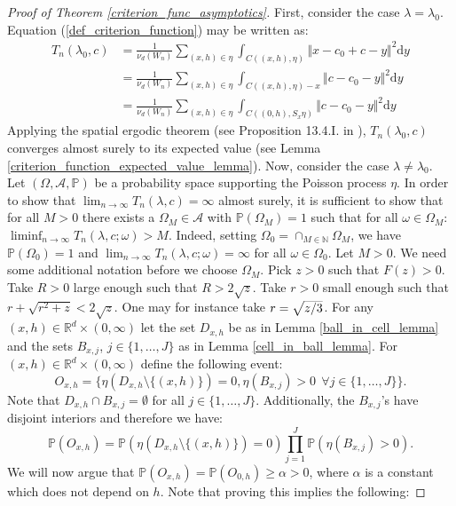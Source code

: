 \documentclass{article}
\newcommand{\NN}{\mathbb{N}}
\newcommand{\RR}{\mathbb{R}}
\newcommand{\PP}{\mathbb{P}}
\theoremstyle{plain}
\theoremstyle{remark}
\theoremstyle{definition}
\begin{document}
\begin{proof}[Proof of Theorem \ref{criterion_func_asymptotics}]
    First, consider the case $\lambda = \lambda_0$. Equation (\ref{def_criterion_function}) may be written as:
    \begin{align*}
        T_n(\lambda_0,c) &= \frac{1}{\nu_d(W_n)}\sum_{(x,h) \in \eta} \int_{C((x,h),\eta)} \Vert x - c_0 +c - y \Vert^2 \mathrm{d}y \\
        &= \frac{1}{\nu_d(W_n)}\sum_{(x,h) \in \eta} \int_{C((x,h),\eta)-x} \Vert c - c_0 - y \Vert^2 \mathrm{d}y \\
        &= \frac{1}{\nu_d(W_n)}\sum_{(x,h) \in \eta} \int_{C((0,h),S_x\eta)} \Vert c - c_0 - y \Vert^2 \mathrm{d}y
    \end{align*}
    Applying the spatial ergodic theorem (see Proposition 13.4.I. in \cite{Daley2008}), $T_n(\lambda_0,c)$ converges almost surely to its expected value (see Lemma \ref{criterion_function_expected_value_lemma}). Now, consider the case $\lambda \neq \lambda_0$. Let $(\Omega,\mathcal{A},\PP)$ be a probability space supporting the Poisson process $\eta$. In order to show that $\lim_{n \to \infty} T_n(\lambda,c)=\infty$ almost surely, it is sufficient to show that for all $M > 0$ there exists a $\Omega_M \in \mathcal{A}$ with $\PP(\Omega_M)=1$ such that for all $\omega \in \Omega_M$: $\liminf_{n \to \infty}T_n(\lambda,c;\omega) > M$. Indeed, setting $\Omega_0 = \cap_{M \in \NN}\Omega_M$, we have $\PP(\Omega_0) = 1$ and $\lim_{n \to \infty}T_n(\lambda,c;\omega) = \infty$ for all $\omega \in \Omega_0$. Let $M > 0$. We need some additional notation before we choose $\Omega_M$. Pick $z > 0$ such that $F(z) > 0$. Take $R >0$ large enough such that $R > 2\sqrt{z}$. Take $r > 0$ small enough such that $r + \sqrt{r^2 + z} < 2\sqrt{z}$. One may for instance take $r = \smash{\sqrt{z/3}}$. For any $(x,h) \in \RR^d \times (0,\infty)$ let the set $D_{x,h}$ be as in Lemma \ref{ball_in_cell_lemma} and the sets $B_{x,j}$, $j \in \{1,\dots,J\}$ as in Lemma \ref{cell_in_ball_lemma}. For $(x,h) \in \RR^d \times(0,\infty)$ define the following event:
    \[O_{x,h} = \{\eta(D_{x,h}\setminus \{(x,h)\})=0, \eta(B_{x,j}) > 0 \ \ \forall j \in \{1,\dots,J\}\}.\]
    Note that $D_{x,h} \cap B_{x,j} = \emptyset$ for all $j \in \{1,\dots,J\}$. Additionally, the $B_{x,j}$'s have disjoint interiors and therefore we have:
    \[\PP(O_{x,h}) = \PP(\eta(D_{x,h}\setminus \{(x,h)\})=0)\prod_{j=1}^J \PP\left(\eta(B_{x,j}) > 0  \right).\]
    We will now argue that $\PP(O_{x,h}) = \PP(O_{0,h}) \geq \alpha > 0$, where $\alpha$ is a constant which does not depend on $h$. Note that proving this implies the following:

\end{proof}
\end{document}
